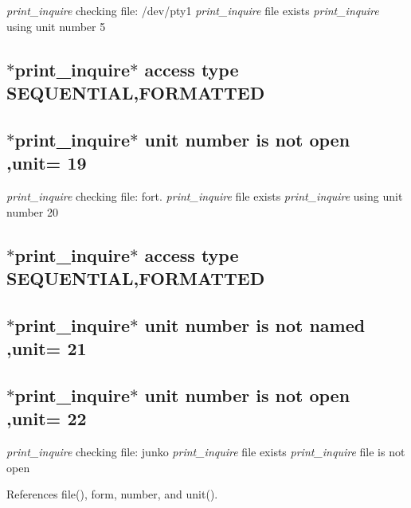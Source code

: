  {\itshape print\+\_\+inquire} checking file\+: /dev/pty1 {\itshape print\+\_\+inquire} file exists {\itshape print\+\_\+inquire} using unit number 5 \subsection*{$\ast$print\+\_\+inquire$\ast$ access type S\+E\+Q\+U\+E\+N\+T\+I\+AL,F\+O\+R\+M\+A\+T\+T\+ED }

\subsection*{$\ast$print\+\_\+inquire$\ast$ unit number is not open ,unit= 19 }

{\itshape print\+\_\+inquire} checking file\+: fort. {\itshape print\+\_\+inquire} file exists {\itshape print\+\_\+inquire} using unit number 20 \subsection*{$\ast$print\+\_\+inquire$\ast$ access type S\+E\+Q\+U\+E\+N\+T\+I\+AL,F\+O\+R\+M\+A\+T\+T\+ED }

\subsection*{$\ast$print\+\_\+inquire$\ast$ unit number is not named ,unit= 21 }

\subsection*{$\ast$print\+\_\+inquire$\ast$ unit number is not open ,unit= 22 }

{\itshape print\+\_\+inquire} checking file\+: junko {\itshape print\+\_\+inquire} file exists {\itshape print\+\_\+inquire} file is not open 

References file(), form, number, and unit().

